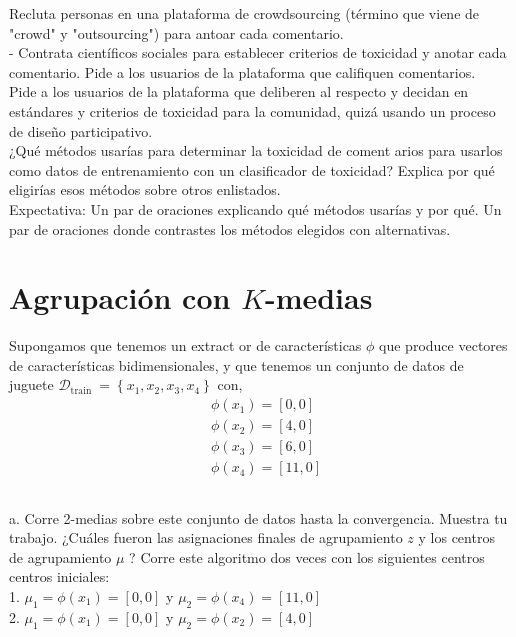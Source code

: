 \documentclass{article}
\begin{document}
Recluta personas en una plataforma de crowdsourcing (término que viene de "crowd" y "outsourcing") para antoar cada comentario.\\
- Contrata científicos sociales para establecer criterios de toxicidad y anotar cada comentario.
Pide a los usuarios de la plataforma que califiquen comentarios.\\
Pide a los usuarios de la plataforma que deliberen al respecto y decidan en estándares y criterios de toxicidad para la comunidad, quizá usando un proceso de diseño participativo.\\
¿Qué métodos usarías para determinar la toxicidad de coment arios para usarlos como datos de entrenamiento con un clasificador de toxicidad? Explica por qué eligirías esos métodos sobre otros enlistados.\\
Expectativa: Un par de oraciones explicando qué métodos usarías y por qué. Un par de oraciones donde contrastes los métodos elegidos con alternativas.


\section{Agrupación con $K$-medias}
 Supongamos que tenemos un extract or de características $\phi$ que produce vectores de características bidimensionales, y que tenemos un conjunto de datos de juguete $\mathcal{D}_{\text {train }}=\left\{x_1, x_2, x_3, x_4\right\}$ con,
$$
\begin{aligned}
& \phi\left(x_1\right)=[0,0] \\
& \phi\left(x_2\right)=[4,0] \\
& \phi\left(x_3\right)=[6,0] \\
& \phi\left(x_4\right)=[11,0]
\end{aligned}
$$

\subsection{}
a. Corre 2-medias sobre este conjunto de datos hasta la convergencia. Muestra tu trabajo. ¿Cuáles fueron las asignaciones finales de agrupamiento $z$ y los centros de agrupamiento $\mu$ ? Corre este algoritmo dos veces con los siguientes centros centros iniciales:\\
1. $\mu_1=\phi\left(x_1\right)=[0,0]$ y $\mu_2=\phi\left(x_4\right)=[11,0]$\\
2. $\mu_1=\phi\left(x_1\right)=[0,0]$ y $\mu_2=\phi\left(x_2\right)=[4,0]$\\
\end{document}
